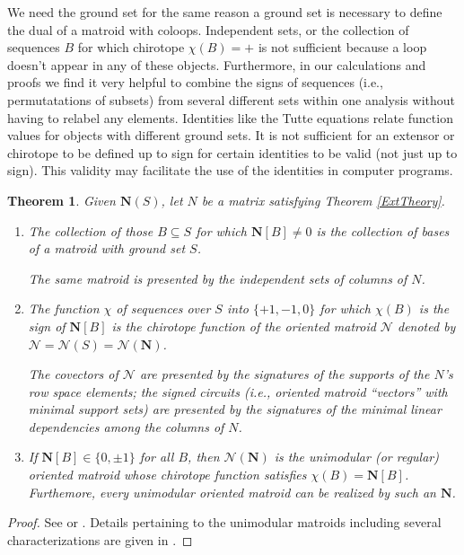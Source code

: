 \documentclass[12pt]{article}
\newtheorem{theorem}{Theorem}[section]
\theoremstyle{definition}
\newcommand{\ext}[1]{\ensuremath{\mathbf{#1}}}
\begin{document}
We need the ground set for the same reason a ground set is necessary
to define the dual of a matroid with coloops.  Independent sets, or
the collection of sequences $B$ for which chirotope $\chi(B)=+$ is not
sufficient because a loop doesn't appear in any of these objects.  
Furthermore, in our calculations and proofs
we find it very helpful to combine the signs of 
sequences (i.e., permutatations of subsets) from several different sets
within one analysis without having to relabel any elements.
Identities like the Tutte equations
relate function values for objects with 
different ground sets.  It is not sufficient for
an extensor or chirotope to be defined up to sign for certain
identities to be valid (not just up to sign).  This validity may
facilitate the use of the identities in computer programs.

\begin{theorem}
Given 
$\ext{N}(S)$, let $N$ be a matrix
satisfying Theorem \ref{ExtTheory}.
\begin{enumerate}
\item
The collection of those $B\subseteq S$ for which $\ext{N}[B]\neq 0$ is the
collection of bases of a matroid with ground set $S$.  

The same matroid is presented by the independent sets of columns of $N$.
\item
The function $\chi$ of sequences over 
$S$ into $\{+1,-1,0\}$ for which
$\chi(B)$ is the sign of $\ext{N}[B]$ is the chirotope function of the
oriented matroid $\mathcal{N}$ denoted by 
$\mathcal{N}=\mathcal{N}(S)=\mathcal{N}(\ext{N})$.

The covectors of $\mathcal{N}$ are presented by the 
signatures of the supports of the $N$'s row space elements; the signed
circuits (i.e., oriented matroid ``vectors'' with minimal support sets)
are presented by the signatures of the minimal linear dependencies 
among the columns of $N$.

\item
If $\ext{N}[B]\in \{0,\pm 1\}$ 
for all $B$, then $\mathcal{N}(\ext{N})$ is 
the unimodular (or regular) oriented matroid whose chirotope
function satisfies $\chi(B)=\ext{N}[B]$.  Furthemore,
every unimodular oriented matroid can be realized by such an 
$\ext{N}$.

\end{enumerate}
\end{theorem}

\begin{proof}
See \cite{OMBOOK} or \cite[chap. 5]{BachemKern}.  Details pertaining to 
the unimodular matroids including several characterizations are given
in \cite[Theorem 3.1.1, p. 41]{CombinatorialGeometries}.
\end{proof}
\end{document}
